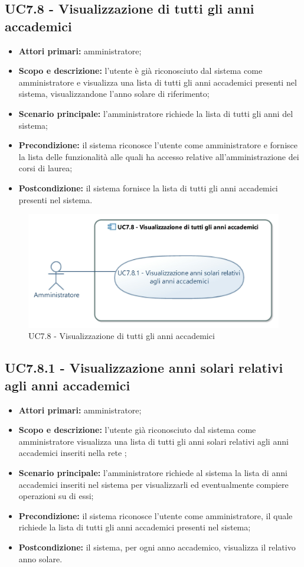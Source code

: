 \documentclass[AnalisiDeiRequisiti.tex]{subfiles}
\begin{document}
\subsection{UC7.8 - Visualizzazione di tutti gli anni accademici}
\begin{itemize}
	\item \textbf{Attori primari:} amministratore;
	\item \textbf{Scopo e descrizione:} l'utente è già riconosciuto dal sistema come amministratore e visualizza una lista di tutti gli anni accademici presenti nel sistema, visualizzandone l'anno solare di riferimento;
	\item \textbf{Scenario principale:} l'amministratore richiede la lista di tutti gli anni del sistema;
	\item \textbf{Precondizione:} il sistema riconosce l'utente come amministratore e fornisce la lista delle funzionalità alle quali ha accesso relative all'amministrazione dei corsi di laurea;
	\item \textbf{Postcondizione:} il sistema fornisce la lista di tutti gli anni accademici presenti nel sistema.
\end{itemize}
\begin{figure}[H]
	\centering
	\includegraphics[width=0.7\linewidth]{UC7_8.jpg}
	\caption{UC7.8 - Visualizzazione di tutti gli anni accademici}
	\label{UC7.8 - Visualizzazione di tutti gli anni accademici}
\end{figure}
\subsection{UC7.8.1 - Visualizzazione anni solari relativi agli anni accademici}
\begin{itemize}
	\item \textbf{Attori primari:} amministratore;
	\item \textbf{Scopo e descrizione:} l'utente già riconosciuto dal sistema come amministratore visualizza una lista di tutti gli anni solari relativi agli anni accademici inseriti nella rete ;
	\item \textbf{Scenario principale:} l'amministratore richiede al sistema la lista di anni accademici inseriti nel sistema per visualizzarli ed eventualmente compiere operazioni su di essi;
	\item \textbf{Precondizione:} il sistema riconosce l'utente come amministratore, il quale richiede la lista di tutti gli anni accademici presenti nel sistema;
	\item \textbf{Postcondizione:} il sistema, per ogni anno accademico, visualizza il relativo anno solare.
\end{itemize}
\end{document}
